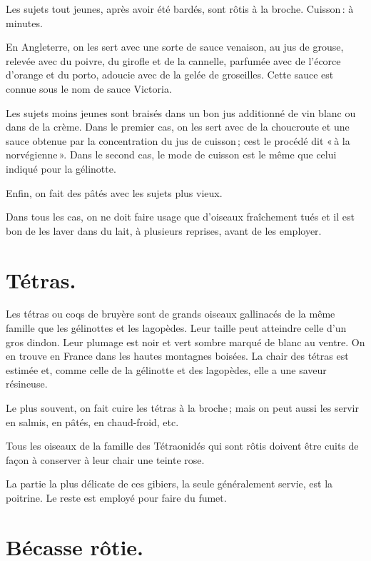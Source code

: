 Les sujets tout jeunes, après avoir été bardés, sont rôtis à la broche.
Cuisson : {\mmm} à {\mmm} minutes.

En Angleterre, on les sert avec une sorte de sauce venaison, au jus de grouse,
relevée avec du poivre, du girofle et de la cannelle, parfumée avec de l'écorce
d'orange et du porto, adoucie avec de la gelée de groseilles. Cette sauce est
connue sous le nom de sauce Victoria.

Les sujets moins jeunes sont braisés dans un bon jus additionné de vin blanc ou
dans de la crème. Dans le premier cas, on les sert avec de la choucroute et une
sauce obtenue par la concentration du jus de cuisson ; cest le procédé dit « à
la norvégienne ». Dans le second cas, le mode de cuisson est le même que celui
indiqué pour la gélinotte.

Enfin, on fait des pâtés avec les sujets plus vieux.

Dans tous les cas, on ne doit faire usage que d'oiseaux fraîchement tués et il
est bon de les laver dans du lait, à plusieurs reprises, avant de les employer.

\section*{\centering Tétras.}
{}

Les tétras ou coqs de bruyère sont de grands oiseaux gallinacés de la même
famille que les gélinottes et les lagopèdes. Leur taille peut atteindre celle
d’un gros dindon. Leur plumage est noir et vert sombre marqué de blanc au
ventre. On en trouve en France dans les hautes montagnes boisées. La chair des
tétras est estimée et, comme celle de la gélinotte et des lagopèdes, elle a une
saveur résineuse.

Le plus souvent, on fait cuire les tétras à la broche ; mais on peut aussi les
servir en salmis, en pâtés, en chaud-froid, etc.

\sk

Tous les oiseaux de la famille des Tétraonidés qui sont rôtis doivent être cuits
de façon à conserver à leur chair une teinte rose.

La partie la plus délicate de ces gibiers, la seule généralement servie, est la
poitrine. Le reste est employé pour faire du fumet.

\section*{\centering Bécasse rôtie.}
{}

